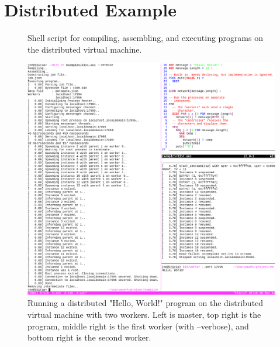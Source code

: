 \documentclass[12pt, twoside]{report}
\begin{document}
  \chapter{Distributed Example} \label{dist-example}
    \begin{figure}[H]
      
      \caption{
        Shell script for compiling, assembling, and executing programs on the
        distributed virtual machine.
      }
      \label{dist-sh}
    \end{figure}
    \begin{figure}[H]
      \includegraphics[width=\textwidth]{images/distributed}
      \caption{
        Running a distributed "Hello, World!" program on the distributed
        virtual machine with two workers. Left is master, top right is the program,
        middle right is the first worker (with --verbose), and bottom right is the
        second worker.
      }
    \end{figure}
\end{document}
